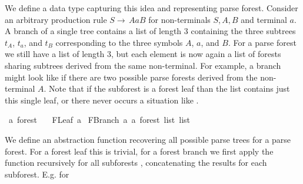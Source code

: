 \begin{isabellebody}
\begin{isamarkuptext}
We define a data type  capturing this idea and representing parse forest. Consider an arbitrary production rule
$S \rightarrow \, AaB$ for non-terminals $S, A, B$ and terminal $a$. A branch of a single tree
contains a list of length $3$ containing the three subtrees $t_A$, $t_a$, and $t_B$ corresponding to
the three symbols $A$, $a$, and $B$. For a parse forest we still have a list of length $3$, but each element is now
again a list of forests sharing subtrees derived from the same non-terminal. For example, a branch
might look like  if there are two possible parse forests derived from
the non-terminal $A$. Note that if the subforest is a forest leaf than the list contains just this
single leaf, or there never occurs a situation like .%
\end{isamarkuptext}\isamarkuptrue%
\isamarkupfalse%
\ {\isacharprime}{\kern0pt}a\ forest\ {\isacharequal}{\kern0pt}\isanewline
\ \ FLeaf\ {\isacharprime}{\kern0pt}a\isanewline
{\isacharbar}{\kern0pt}\ FBranch\ {\isacharprime}{\kern0pt}a\ {\isachardoublequoteopen}{\isacharprime}{\kern0pt}a\ forest\ list\ list{\isachardoublequoteclose}%
\begin{isamarkuptext}%
We define an abstraction function  recovering all possible parse trees for a parse forest.
For a forest leaf this is trivial, for a forest branch  we first apply the function
 recursively for all subforests , concatenating the results for each subforest. E.g. for

\end{isamarkuptext}
\end{isabellebody}
